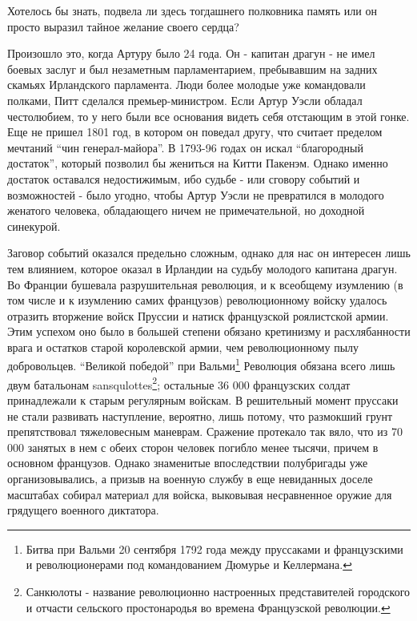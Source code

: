 \documentclass[
  oneside,
  12pt,
  titlepage]{book}
\begin{document}
Хотелось бы знать, подвела ли здесь тогдашнего полковника память или он просто выразил тайное желание своего сердца?

Произошло это, когда Артуру было 24 года. Он - капитан драгун - не имел боевых заслуг и был незаметным парламентарием, пребывавшим на задних скамьях Ирландского парламента. Люди более молодые уже командовали полками, Питт сделался премьер-министром. Если Артур Уэсли обладал честолюбием, то у него были все основания видеть себя отстающим в этой гонке. Еще не пришел 1801 год, в котором он поведал другу, что считает пределом мечтаний ``чин генерал-майора''. В 1793-96 годах он искал ``благородный достаток'', который позволил бы жениться на Китти Пакенэм. Однако именно достаток оставался недостижимым, ибо судьбе - или сговору событий и возможностей - было угодно, чтобы Артур Уэсли не превратился в молодого женатого человека, обладающего ничем не примечательной, но доходной синекурой.

Заговор событий оказался предельно сложным, однако для нас он интересен лишь тем влиянием, которое оказал в Ирландии на судьбу молодого капитана драгун. Во Франции бушевала разрушительная революция, и к всеобщему изумлению (в том числе и к изумлению самих французов) революционному войску удалось отразить вторжение войск Пруссии и натиск французской роялистской армии. Этим успехом оно было в большей степени обязано кретинизму и расхлябанности врага и остатков старой королевской армии, чем революционному пылу добровольцев. ``Великой победой'' при Вальми\footnote{Битва при Вальми 20 сентября 1792 года между пруссаками и французскими и революционерами под командованием Дюмурье и Келлермана.} Революция обязана всего лишь двум батальонам sansqulottes\footnote{Санкюлоты - название революционно настроенных представителей городского и отчасти сельского простонародья во времена Французской революции.}; остальные 36 000 французских солдат принадлежали к старым регулярным войскам. В решительный момент пруссаки не стали развивать наступление, вероятно, лишь потому, что размокший грунт препятствовал тяжеловесным маневрам. Сражение протекало так вяло, что из 70 000 занятых в нем с обеих сторон человек погибло менее тысячи, причем в основном французов. Однако знаменитые впоследствии полубригады уже организовывались, а призыв на военную службу в еще невиданных доселе масштабах собирал материал для войска, выковывая несравненное оружие для грядущего военного диктатора.
\end{document}
